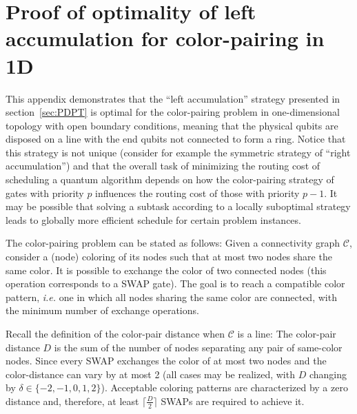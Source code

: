 \documentclass[%
onecolumn,pra,
superscriptaddress,
nofootinbib,
 amsmath,amssymb,
 aps,
11pt,
]{revtex4-1}
\begin{document}
\bigskip\noindent\makebox[\linewidth]{\resizebox{0.3333\linewidth}{1pt}{$\bullet$}}\bigskip

\section{Proof of optimality of left accumulation for color-pairing in 1D}
\label{app:optimality_color_pairing_1D}

This appendix demonstrates that the ``left accumulation'' strategy presented in section~\ref{sec:PDPT} is optimal for the color-pairing problem in one-dimensional topology with open boundary conditions, meaning that the physical qubits are disposed on a line with the end qubits not connected to form a ring.
Notice that this strategy is not unique (consider for example the symmetric strategy of ``right accumulation'') and that the overall task of minimizing the routing cost of scheduling a quantum algorithm depends on how the color-pairing strategy of gates with priority $p$ influences the routing cost of those with priority $p-1$. It may be possible that solving a subtask according to a locally suboptimal strategy leads to globally more efficient schedule for certain problem instances.

The color-pairing problem can be stated as follows:
Given a connectivity graph $\mathcal{C}$, consider a (node) coloring of its nodes such that at most two nodes share the same color. It is possible to exchange the color of two connected nodes (this operation corresponds to a SWAP gate). The goal is to reach a compatible color pattern, \emph{i.e.} one in which all nodes sharing the same color are connected, with the minimum number of exchange operations.

Recall the definition of the color-pair distance when $\mathcal{C}$ is a line: The color-pair distance $D$ is the sum of the number of nodes separating any pair of same-color nodes.
Since every SWAP exchanges the color of at most two nodes and the color-distance can vary by at most 2 (all cases may be realized, with $D$ changing by $\delta\in\{-2,-1,0,1,2\}$). Acceptable coloring patterns are characterized by a zero distance and, therefore, at least $\lceil\frac{D}{2}\rceil$ SWAPs are required to achieve it.
\end{document}
